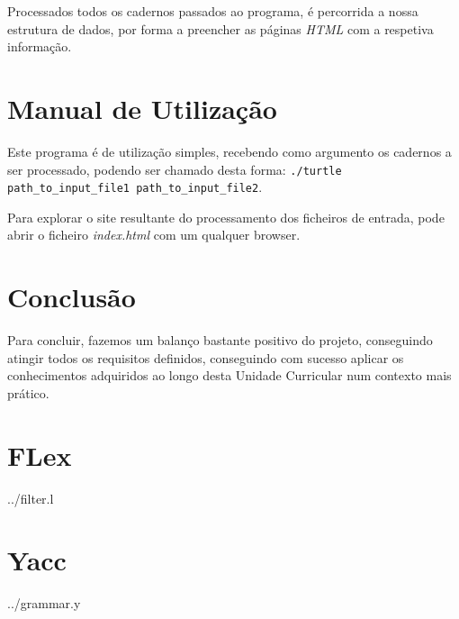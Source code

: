 \documentclass[a4paper]{report}
\begin{document}
Processados todos os cadernos passados ao programa, é percorrida a nossa
estrutura de dados, por forma a preencher as páginas \textit{HTML} com a
respetiva informação.

\chapter{Manual de Utilização}

Este programa é de utilização simples, recebendo como argumento os cadernos a ser processado, 
podendo ser chamado desta forma: 
\verb!./turtle path_to_input_file1 path_to_input_file2!.

Para explorar o site resultante do processamento dos ficheiros de entrada, pode
abrir o ficheiro \textit{index.html} com um qualquer browser.

\chapter{Conclusão}

Para concluir, fazemos um balanço bastante positivo do projeto, conseguindo
atingir todos os requisitos definidos, conseguindo com sucesso aplicar os
conhecimentos adquiridos ao longo desta Unidade Curricular num contexto mais
prático.

\appendix

\chapter{FLex}

{../filter.l}

\chapter{Yacc} \label{apx:yacc}

{../grammar.y}
\end{document}
